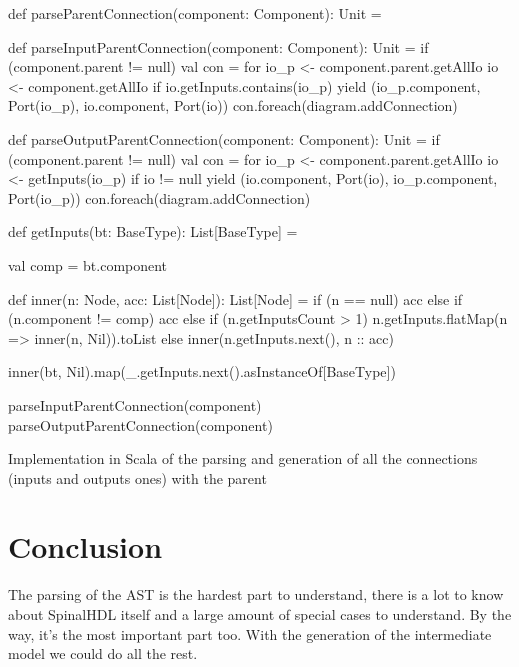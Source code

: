 \begin{listing}[H]
  \centering
  \begin{scalacode}
  def parseParentConnection(component: Component): Unit = {

    def parseInputParentConnection(component: Component): Unit = {
      if (component.parent != null) {
        val con = for {
          io_p <- component.parent.getAllIo
          io <- component.getAllIo
          if io.getInputs.contains(io_p)
        } yield (io_p.component, Port(io_p), io.component, Port(io))
        con.foreach(diagram.addConnection)
      }
    }

    def parseOutputParentConnection(component: Component): Unit = {
      if (component.parent != null) {
        val con = for {
          io_p <- component.parent.getAllIo
          io <- getInputs(io_p)
          if io != null
        } yield (io.component, Port(io), io_p.component, Port(io_p))
        con.foreach(diagram.addConnection)
      }
    }

    def getInputs(bt: BaseType): List[BaseType] = {
      val comp = bt.component

      def inner(n: Node, acc: List[Node]): List[Node] = {
        if (n == null) acc
        else if (n.component != comp) {
          acc
        }
        else if (n.getInputsCount > 1) {
          n.getInputs.flatMap(n => inner(n, Nil)).toList
        }
        else {
          inner(n.getInputs.next(), n :: acc)
        }
      }

      inner(bt, Nil).map(_.getInputs.next().asInstanceOf[BaseType])
  }

    parseInputParentConnection(component)
    parseOutputParentConnection(component)
  }
\end{scalacode}
  \caption[Parsing and generation of the connections with the
  parent]{Implementation in Scala of the parsing and generation of all the
    connections (inputs and outputs ones) with the parent}
  \label{lst:parse-parent-connection}
\end{listing}

\section{Conclusion}
\label{sec:ast-parsing-conclusion}

The parsing of the AST is the hardest part to understand, there is a lot to know
about SpinalHDL itself and a large amount of special cases to understand. By the
way, it's the most important part too. With the generation of the
intermediate model we could do all the rest.

